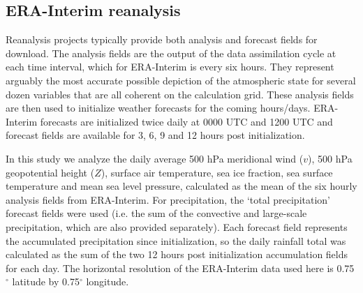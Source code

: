 \subsection{ERA-Interim reanalysis}

Reanalysis projects typically provide both analysis and forecast fields for download. The analysis fields are the output of the data assimilation cycle at each time interval, which for ERA-Interim is every six hours. They represent arguably the most accurate possible depiction of the atmospheric state for several dozen variables that are all coherent on the calculation grid. These analysis fields are then used to initialize weather forecasts for the coming hours/days. ERA-Interim forecasts are initialized twice daily at 0000 UTC and 1200 UTC and forecast fields are available for 3, 6, 9 and 12 hours post initialization.  

In this study we analyze the daily average 500 hPa meridional wind ($v$), 500 hPa geopotential height ($Z$), surface air temperature, sea ice fraction, sea surface temperature and mean sea level pressure, calculated as the mean of the six hourly analysis fields from ERA-Interim. For precipitation, the `total precipitation' forecast fields were used (i.e. the sum of the convective and large-scale precipitation, which are also provided separately). Each forecast field represents the accumulated precipitation since initialization, so the daily rainfall total was calculated as the sum of the two 12 hours post initialization accumulation fields for each day. The horizontal resolution of the ERA-Interim data used here is 0.75$^{\circ}$ latitude by 0.75$^{\circ}$ longitude.   
    
    